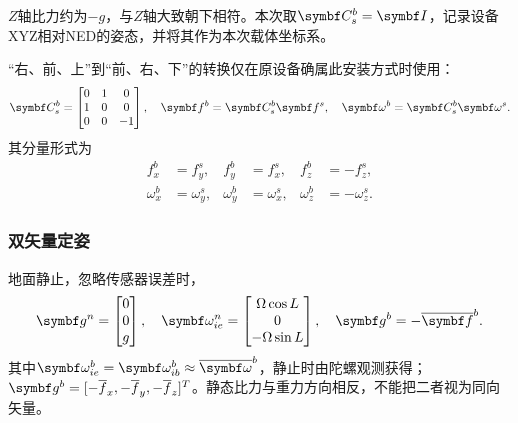 $Z$轴比力约为$-g$，与$Z$轴大致朝下相符。本次取$\matr C_s^b=\matr I$，记录设备XYZ相对NED的姿态，并将其作为本次载体坐标系。

“右、前、上”到“前、右、下”的转换仅在原设备确属此安装方式时使用：
\begin{equation}
\matr C_s^b=\begin{bmatrix}0&1&0\\1&0&0\\0&0&-1\end{bmatrix},\quad
\matr f^b=\matr C_s^b\matr f^s,\quad\matr\omega^b=\matr C_s^b\matr\omega^s.
\label{eq:axismatrix}
\end{equation}
其分量形式为
\begin{equation}
\begin{aligned}
f_x^b&=f_y^s,& f_y^b&=f_x^s,& f_z^b&=-f_z^s,\\
\omega_x^b&=\omega_y^s,& \omega_y^b&=\omega_x^s,& \omega_z^b&=-\omega_z^s.
\end{aligned}
\label{eq:axiscomponents}\end{equation}

\subsubsection{双矢量定姿}
地面静止，忽略传感器误差时，
\begin{equation}
\matr g^n=\begin{bmatrix}0\\0\\g\end{bmatrix},\quad
\matr\omega_{ie}^n=\begin{bmatrix}\Omega\cos L\\0\\-\Omega\sin L\end{bmatrix},\quad
\matr g^b=-\overline{\matr f}^b.
\label{eq:referencevectors}
\end{equation}
其中$\matr\omega_{ie}^b=\matr\omega_{ib}^b\approx\overline{\matr\omega}^b$，静止时由陀螺观测获得；$\matr g^b=[-\overline f_x,-\overline f_y,-\overline f_z]^T$。静态比力与重力方向相反，不能把二者视为同向矢量。

